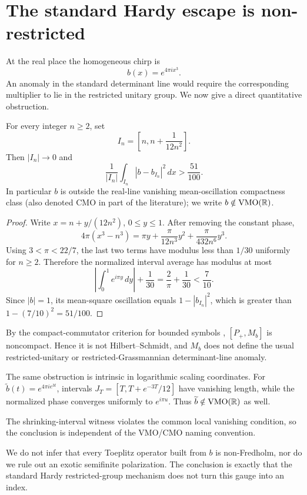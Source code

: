 \section{The standard Hardy escape is non-restricted}

At the real place the homogeneous chirp is
\[
  b(x)=e^{4\pi i x^3}.
\]
An anomaly in the standard determinant line would require the corresponding
multiplier to lie in the restricted unitary group.  We now give a direct
quantitative obstruction.

\begin{theorem}\label{thm:vmo}
For every integer \(n\ge2\), set
\[
  I_n=\left[n,n+\frac{1}{12n^2}\right].
\]
Then \(|I_n|\to0\) and
\begin{equation}\label{eq:variance}
  \frac1{|I_n|}\int_{I_n}|b-b_{I_n}|^2\,dx>\frac{51}{100}.
\end{equation}
In particular \(b\) is outside the real-line vanishing mean-oscillation
compactness class (also denoted \(\mathrm{CMO}\) in part of the
literature); we write \(b\notin\operatorname{VMO}(\mathbb{R})\).
\end{theorem}

\begin{proof}
Write \(x=n+y/(12n^2)\), \(0\le y\le1\).  After removing the constant
phase,
\begin{equation}\label{eq:phase-expansion}
  4\pi(x^3-n^3)
  =\pi y+\frac{\pi}{12n^3}y^2+
    \frac{\pi}{432n^6}y^3.
\end{equation}
Using \(3<\pi<22/7\), the last two terms have modulus less than \(1/30\)
uniformly for \(n\ge2\).  Therefore the normalized interval average has
modulus at most
\[
  \left|\int_0^1e^{i\pi y}\,dy\right|+\frac{1}{30}
  =\frac{2}{\pi}+\frac{1}{30}<\frac{7}{10}.
\]
Since \(|b|=1\), its mean-square oscillation equals
\(1-|b_{I_n}|^2\), which is greater than \(1-(7/10)^2=51/100\).
\end{proof}

By the compact-commutator criterion for bounded symbols
\citep{Uchiyama1978}, \([P_+,M_b]\) is noncompact.  Hence it is not
Hilbert--Schmidt, and \(M_b\) does not define the usual restricted-unitary
or restricted-Grassmannian determinant-line anomaly.

The same obstruction is intrinsic in logarithmic scaling coordinates.  For
\(\widetilde b(t)=e^{4\pi i e^{3t}}\), intervals
\(J_T=[T,T+e^{-3T}/12]\) have vanishing length, while the normalized phase
converges uniformly to \(e^{i\pi u}\).  Thus
\(\widetilde b\notin\operatorname{VMO}(\mathbb{R})\) as well.

The shrinking-interval witness violates the common local vanishing
condition, so the conclusion is independent of the VMO/CMO naming
convention.

We do not infer that every Toeplitz operator built from \(b\) is non-Fredholm,
nor do we rule out an exotic semifinite polarization.  The conclusion is
exactly that the standard Hardy restricted-group mechanism does not turn
this gauge into an index.

